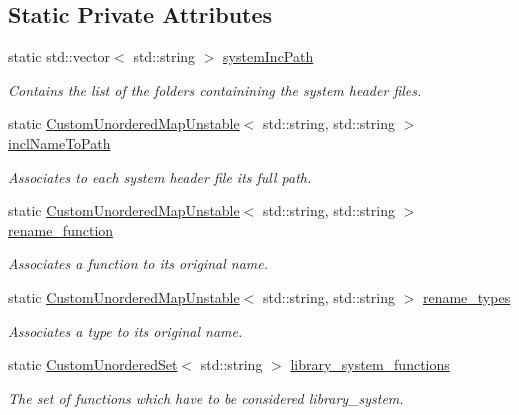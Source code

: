\subsection*{Static Private Attributes}
\begin{DoxyCompactItemize}
\item 
static std\+::vector$<$ std\+::string $>$ \hyperlink{classCheckSystemType_a039ba0b9690c9ef162e26fc2eb2f275b}{system\+Inc\+Path}
\begin{DoxyCompactList}\small\item\em Contains the list of the folders containining the system header files. \end{DoxyCompactList}\item 
static \hyperlink{custom__map_8hpp_a8cbaceffc09790a885ec7e9c17809c69}{Custom\+Unordered\+Map\+Unstable}$<$ std\+::string, std\+::string $>$ \hyperlink{classCheckSystemType_a8b0d505fbb50dce89783120fa9b77fba}{incl\+Name\+To\+Path}
\begin{DoxyCompactList}\small\item\em Associates to each system header file its full path. \end{DoxyCompactList}\item 
static \hyperlink{custom__map_8hpp_a8cbaceffc09790a885ec7e9c17809c69}{Custom\+Unordered\+Map\+Unstable}$<$ std\+::string, std\+::string $>$ \hyperlink{classCheckSystemType_af954e17fc21b9b472a5720ade293c6fb}{rename\+\_\+function}
\begin{DoxyCompactList}\small\item\em Associates a function to its original name. \end{DoxyCompactList}\item 
static \hyperlink{custom__map_8hpp_a8cbaceffc09790a885ec7e9c17809c69}{Custom\+Unordered\+Map\+Unstable}$<$ std\+::string, std\+::string $>$ \hyperlink{classCheckSystemType_a73529c87de98015d0373156d3c0cb326}{rename\+\_\+types}
\begin{DoxyCompactList}\small\item\em Associates a type to its original name. \end{DoxyCompactList}\item 
static \hyperlink{classCustomUnorderedSet}{Custom\+Unordered\+Set}$<$ std\+::string $>$ \hyperlink{classCheckSystemType_af0b680e809a1f861ed10cb3ba5b0926d}{library\+\_\+system\+\_\+functions}
\begin{DoxyCompactList}\small\item\em The set of functions which have to be considered library\+\_\+system. \end{DoxyCompactList}\item 

\end{DoxyCompactItemize}
